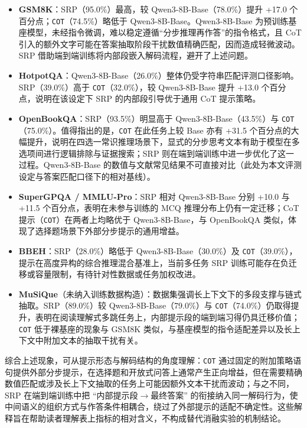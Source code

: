 \begin{itemize}
    \item \textbf{GSM8K}：SRP（95.0\%）最高，较 Qwen3-8B-Base（78.0\%）提升 +17.0 个百分点；\texttt{COT}（74.5\%）略低于 Qwen3-8B-Base。Qwen3-8B-Base 为预训练基座模型，未经指令微调，难以稳定遵循“分步推理再作答”的指令格式，且 CoT 引入的额外文字可能在答案抽取阶段干扰数值精确匹配，因而造成轻微波动。SRP 借助端到端训练将内部段嵌入解码流程，避开了上述问题。
    \item \textbf{HotpotQA}：Qwen3-8B-Base（26.0\%）整体仍受字符串匹配评测口径影响。SRP（39.0\%）高于 \texttt{COT}（32.0\%），较 Qwen3-8B-Base 提升 +13.0 个百分点，说明在该设定下 SRP 的内部段引导优于通用 CoT 提示策略。
    \item \textbf{OpenBookQA}：SRP（93.5\%）明显高于 Qwen3-8B-Base（43.5\%）与 \texttt{COT}（75.0\%）。值得指出的是，\texttt{COT} 在此任务上较 Base 亦有 +31.5 个百分点的大幅提升，说明在四选一常识推理场景下，显式的分步思考文本有助于模型在多选项间进行逻辑排除与证据搜索；SRP 则在端到端训练中进一步优化了这一过程。Qwen3-8B-Base 的数值与文献常见结果不可直接对比（此处为本文评测设定与答案匹配口径下的相对基线）。
    \item \textbf{SuperGPQA / MMLU-Pro}：SRP 相对 Qwen3-8B-Base 分别 +10.0 与 +11.5 个百分点，表明在未参与训练的 MCQ 推理分布上仍有一定迁移；CoT 提示（\texttt{COT}）在两者上均略优于 Qwen3-8B-Base，与 OpenBookQA 类似，体现了选择题场景下外部分步提示的通用增益。
    \item \textbf{BBEH}：SRP（28.0\%）略低于 Qwen3-8B-Base（30.0\%）及 \texttt{COT}（39.0\%），提示在高度异构的综合推理混合基准上，当前多任务 SRP 训练可能存在负迁移或容量限制，有待针对性数据或任务加权改进。
    \item \textbf{MuSiQue}（未纳入训练数据构造）：数据集强调长上下文下的多段支撑与链式抽取。SRP（89.0\%）较 Qwen3-8B-Base（79.0\%）与 \texttt{COT}（74.0\%）仍取得提升，表明在阅读理解式多跳任务上，内部提示段的端到端习得仍具迁移价值；\texttt{COT} 低于裸基座的现象与 GSM8K 类似，与基座模型的指令适配差异以及长上下文中附加文本的抽取干扰有关。
\end{itemize}

综合上述现象，可从提示形态与解码结构的角度理解：\texttt{COT} 通过固定的附加策略语句提供外部分步提示，在选择题和开放式问答上通常产生正向增益，但在需要精确数值匹配或涉及长上下文抽取的任务上可能因额外文本干扰而波动；与之不同，SRP 在端到端训练中把 ``内部提示段$\rightarrow$最终答案'' 的衔接纳入同一解码行为，使中间语义的组织方式与作答条件相耦合，绕过了外部提示的适配不确定性。这些解释旨在帮助读者理解表上指标的相对含义，不构成替代消融实验的机制结论。

